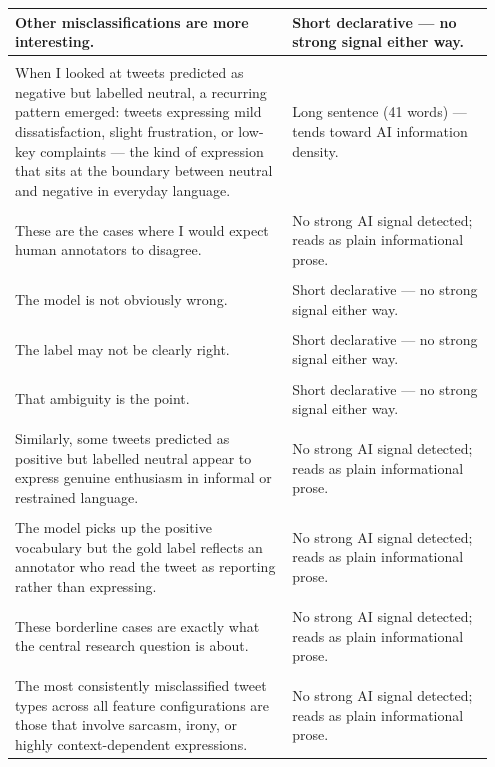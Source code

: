 \documentclass[11pt]{article}
\begin{document}
\begin{longtable}{|p{0.55\linewidth}|p{0.40\linewidth}|}
\hline
Other misclassifications are more interesting. & Short declarative --- no strong signal either way. \\[2pt]
\hline
\rule{0pt}{3.5cm} & \\
\hline
When I looked at tweets predicted as negative but labelled neutral, a recurring pattern emerged: tweets expressing mild dissatisfaction, slight frustration, or low-key complaints --- the kind of expression that sits at the boundary between neutral and negative in everyday language. & Long sentence (41 words) --- tends toward AI information density. \\[2pt]
\hline
\rule{0pt}{3.5cm} & \\
\hline
These are the cases where I would expect human annotators to disagree. & No strong AI signal detected; reads as plain informational prose. \\[2pt]
\hline
\rule{0pt}{3.5cm} & \\
\hline
The model is not obviously wrong. & Short declarative --- no strong signal either way. \\[2pt]
\hline
\rule{0pt}{3.5cm} & \\
\hline
The label may not be clearly right. & Short declarative --- no strong signal either way. \\[2pt]
\hline
\rule{0pt}{3.5cm} & \\
\hline
That ambiguity is the point. & Short declarative --- no strong signal either way. \\[2pt]
\hline
\rule{0pt}{3.5cm} & \\
\hline
Similarly, some tweets predicted as positive but labelled neutral appear to express genuine enthusiasm in informal or restrained language. & No strong AI signal detected; reads as plain informational prose. \\[2pt]
\hline
\rule{0pt}{3.5cm} & \\
\hline
The model picks up the positive vocabulary but the gold label reflects an annotator who read the tweet as reporting rather than expressing. & No strong AI signal detected; reads as plain informational prose. \\[2pt]
\hline
\rule{0pt}{3.5cm} & \\
\hline
These borderline cases are exactly what the central research question is about. & No strong AI signal detected; reads as plain informational prose. \\[2pt]
\hline
\rule{0pt}{3.5cm} & \\
\hline
The most consistently misclassified tweet types across all feature configurations are those that involve sarcasm, irony, or highly context-dependent expressions. & No strong AI signal detected; reads as plain informational prose. \\[2pt]

\end{longtable}
\end{document}
